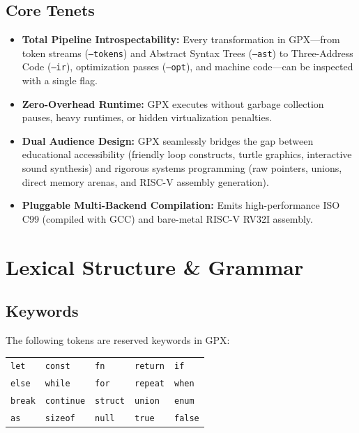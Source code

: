 \documentclass[11pt,a4paper]{report}
\begin{document}
\section{Core Tenets}
\begin{itemize}
    \item \textbf{Total Pipeline Introspectability:} Every transformation in GPX---from token streams (\texttt{--tokens}) and Abstract Syntax Trees (\texttt{--ast}) to Three-Address Code (\texttt{--ir}), optimization passes (\texttt{--opt}), and machine code---can be inspected with a single flag.
    \item \textbf{Zero-Overhead Runtime:} GPX executes without garbage collection pauses, heavy runtimes, or hidden virtualization penalties.
    \item \textbf{Dual Audience Design:} GPX seamlessly bridges the gap between educational accessibility (friendly loop constructs, turtle graphics, interactive sound synthesis) and rigorous systems programming (raw pointers, unions, direct memory arenas, and RISC-V assembly generation).
    \item \textbf{Pluggable Multi-Backend Compilation:} Emits high-performance ISO C99 (compiled with GCC) and bare-metal RISC-V RV32I assembly.
\end{itemize}

\chapter{Lexical Structure \& Grammar}

\section{Keywords}
The following tokens are reserved keywords in GPX:
\begin{center}
\begin{tabular}{lllll}
\texttt{let} & \texttt{const} & \texttt{fn} & \texttt{return} & \texttt{if} \\
\texttt{else} & \texttt{while} & \texttt{for} & \texttt{repeat} & \texttt{when} \\
\texttt{break} & \texttt{continue} & \texttt{struct} & \texttt{union} & \texttt{enum} \\
\texttt{as} & \texttt{sizeof} & \texttt{null} & \texttt{true} & \texttt{false} \\
\end{tabular}
\end{center}
\end{document}
